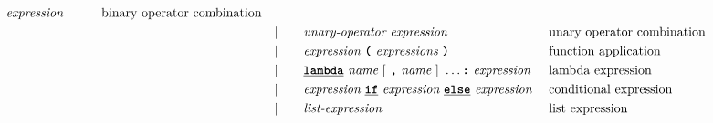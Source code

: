 \begin{alignat*}{9}
                                            \textit{expression} \qquad
                                                           && \textrm{binary operator combination}\\
&&                       && |   &\quad &&   \textit{unary-operator} \ 
                                            \textit{expression}
                                                           && \textrm{unary operator combination}\\
&&                       && |   &\quad &&   \textit{expression} \ 
                                            \textbf{\texttt{(}}\ \textit{expressions}\
                                            \textbf{\texttt{)}}
                                                           && \textrm{function application}\\
&&                       && |   &\quad &&   \textbf{\texttt{\underline{lambda}}} \ 
                                            \textit{name} \ 
                                                   [\ \textbf{\texttt{,}} \ \textit{name}\ ]\ \ldots
                                            \texttt{\textbf{:}}\ \textit{expression}
                                                           && \textrm{lambda expression}\\
&&                       && |   &\quad &&   \textit{expression} \ 
                                            \textbf{\texttt{\underline{if}}} \ \textit{expression} \ 
                                            \textbf{\texttt{\underline{else}}} \ \textit{expression} \ 
                                                           && \textrm{conditional expression}\\
&&                       && |   &\quad &&   \textit{list-expression} && \textrm{list expression} \\

\end{alignat*}
